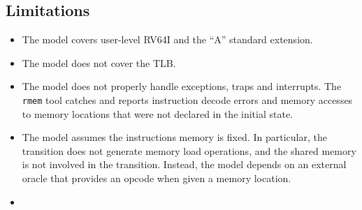 \subsection{Limitations}\label{sec:omm:limitations}
\begin{itemize}
\item The model covers user-level RV64I and the ``A'' standard extension.
\item The model does not cover the TLB.
\item The model does not properly handle exceptions, traps and interrupts.
The {\tt rmem} tool catches and reports instruction decode errors and memory accesses to memory locations that were not declared in the initial state.
\item The model assumes the instructions memory is fixed.
In particular, the  transition does not generate memory load operations, and the shared memory is not involved in the transition.
Instead, the model depends on an external oracle that provides an opcode when given a memory location.
\item {}
\end{itemize}


